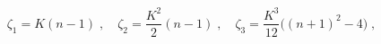 \begin{equation}
\zeta_1 = K(n-1) \;,\quad 
\zeta_2 = \frac{K^2}{2} (n-1) \;,\quad 
\zeta_3 = \frac{K^3}{12}\big( (n+1)^2 -4 \big)\;,
\label{zeta_gmax}
\end{equation}

